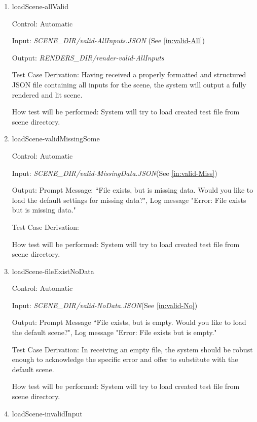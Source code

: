 \documentclass[12pt, titlepage]{article}
\begin{document}
\begin{enumerate}

\item{loadScene-allValid\\}

Control: Automatic
								
Input: \textit{SCENE\_DIR/valid-AllInputs.JSON} (See \ref{in:valid-All})
					
Output: \textit{RENDERS\_DIR/render-valid-AllInputs}

Test Case Derivation: Having received a properly formatted and structured JSON 
file containing all inputs for the scene, the system will output a fully 
rendered and lit scene.
					
How test will be performed: System will try to load created test file from 
scene directory.
					
\item{loadScene-validMissingSome\\}

Control: Automatic

Input: \textit{SCENE\_DIR/valid-MissingData.JSON}(See \ref{in:valid-Miss})

Output: Prompt Message: ``File exists, but is missing data. Would you like to 
load the default settings for missing data?", Log message "Error: File exists 
but is missing data."

Test Case Derivation: 

How test will be performed: System will try to load created test file from 
scene directory.

\item{loadScene-fileExistNoData\\}

Control: Automatic
									
Input: \textit{SCENE\_DIR/valid-NoData.JSON}(See \ref{in:valid-No})

Output: Prompt Message ``File exists, but is empty. Would you like to load the 
default scene?", Log message "Error: File exists but is empty."

Test Case Derivation: In receiving an empty file, the system should be robust 
enough to acknowledge the specific error and offer to substitute with the 
default scene.

How test will be performed: System will try to load created test file from 
scene directory.

\item{loadScene-invalidInput\\}


\end{enumerate}
\end{document}
